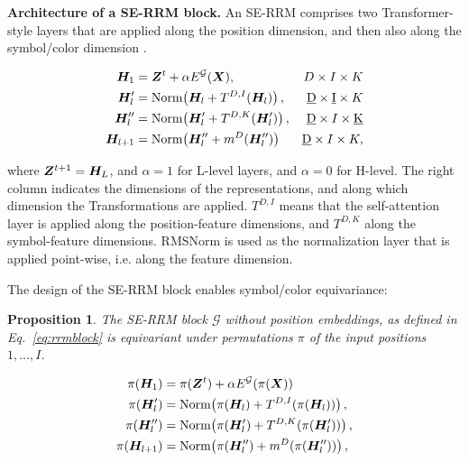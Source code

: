 \documentclass{article}
\theoremstyle{plain}
\newtheorem{proposition}[theorem]{Proposition}
\theoremstyle{definition}
\theoremstyle{remark}
\renewcommand{\paragraph}[1]{\textbf{#1}\;}
\begin{document}
\paragraph{Architecture of a SE-RRM block.}
An SE-RRM comprises two Transformer-style layers that
are applied along the position dimension, and
then also along the symbol/color dimension
\citep{rao2021msa,tolstikhin2021mlp,ho2019axial,huang2019ccnet}.

\begin{align} \label{eq:rrmblock}
    \bm{H}_1 &= \bm{Z}^t + \alpha E^{\mathcal G}(\bm{X}), &  D \times  I \times K \\
    \bm{H}'_{l} &= \text{Norm}\!\left( \bm{H}_{l} + T^{D,I}(\bm{H}_{l}) \right), &  \underbar{D} \times  \underbar{I} \times K \\
    \bm{H}''_{l} &= \text{Norm}\!\left(\bm{H}'_{l} + T^{D,K}(\bm{H}'_{l})\right), &  \underbar{D} \times  I \times \underbar{K} \\
    \bm{H}_{l+1} &= \text{Norm}\!\left(\bm{H}''_{l} + m^{D}(\bm{H}''_{l})\right) & \underbar{D} \times I \times K,
\end{align}

where $\bm{Z}^{t+1}=\bm{H}_L$, and 
$\alpha=1$ for L-level layers, and $\alpha=0$ for H-level.
The right column indicates the dimensions of the 
representations, and along which dimension the Transformations are applied. 
$T^{D,I}$ means that the self-attention
layer is applied along the position-feature dimensions, 
and $T^{D,K}$ along the symbol-feature dimensions. 
RMSNorm \citep{zhang2019root} is used as the normalization layer that 
is applied point-wise, i.e. along the feature dimension.


The design of the SE-RRM block enables symbol/color
equivariance: 

\begin{proposition}
    The SE-RRM block $\mathcal{G}$ without position embeddings, 
    as defined in 
    Eq.~\eqref{eq:rrmblock} is equivariant under
    permutations $\pi$ of the input positions $1,\ldots,I$. 
\end{proposition}

\begin{align} 
    \pi(\bm{H}_1) &= \pi(\bm{Z}^t) + \alpha E^{\mathcal G}(\pi(\bm{X}))  \\
    \pi(\bm{H}'_{l}) &= \text{Norm}\!\left( \pi(\bm{H}_{l}) + T^{D,I}(\pi(\bm{H}_{l})) \right),  \\
    \pi(\bm{H}''_{l}) &= \text{Norm}\!\left(\pi(\bm{H}'_{l}) + T^{D,K}(\pi(\bm{H}'_{l}))\right), \\
    \pi(\bm{H}_{l+1}) &= \text{Norm}\!\left(\pi(\bm{H}''_{l}) + m^{D}(\pi(\bm{H}''_{l}))\right) ,
\end{align}
\end{document}
